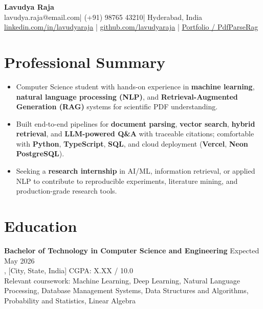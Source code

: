 \documentclass[11pt,letterpaper]{article}
\makeatletter
\newcommand{\resumename}{Lavudya Raja}
\newcommand{\resumeemail}{lavudya.raja@email.com}
\newcommand{\resumephone}{(+91) 98765 43210}
\newcommand{\resumelocation}{Hyderabad, India}
\newcommand{\resumelinkedin}{linkedin.com/in/lavudyaraja}
\newcommand{\resumegithub}{github.com/lavudyaraja}
\newcommand{\resumeportfolio}{github.com/lavudyaraja/Rag-citation-source}
\makeatother
\begin{document}
\begin{center}
  {\LARGE \textbf{\resumename}} \\[6pt]
  \resumeemail \;|\; \resumephone \;|\; \resumelocation \\[2pt]
  \href{https://\resumelinkedin}{\resumelinkedin} \;|\;
  \href{https://\resumegithub}{\resumegithub} \;|\;
  \href{https://\resumeportfolio}{Portfolio / PdfParseRag}
\end{center}

\vspace{4pt}

\section{Professional Summary}
\begin{itemize}
  \item Computer Science student with hands-on experience in \textbf{machine learning}, \textbf{natural language processing (NLP)}, and \textbf{Retrieval-Augmented Generation (RAG)} systems for scientific PDF understanding.
  \item Built end-to-end pipelines for \textbf{document parsing}, \textbf{vector search}, \textbf{hybrid retrieval}, and \textbf{LLM-powered Q\&A} with traceable citations; comfortable with \textbf{Python}, \textbf{TypeScript}, \textbf{SQL}, and cloud deployment (\textbf{Vercel}, \textbf{Neon PostgreSQL}).
  \item Seeking a \textbf{research internship} in AI/ML, information retrieval, or applied NLP to contribute to reproducible experiments, literature mining, and production-grade research tools.
\end{itemize}

\section{Education}
\textbf{Bachelor of Technology in Computer Science and Engineering} \hfill Expected May 2026 \\
[University Name], [City, State, India] \hfill CGPA: X.XX / 10.0 \\
Relevant coursework: Machine Learning, Deep Learning, Natural Language Processing, Database Management Systems, Data Structures and Algorithms, Probability and Statistics, Linear Algebra

\end{document}
